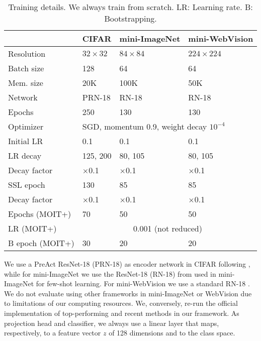 \documentclass[final]{cvpr}
\begin{document}
\begin{table}[!t]
\centering{}\caption{\label{tab:Training-details}Training details. We always train from
scratch. LR: Learning rate. B: Bootstrapping.}
\smallskip{}
\setlength{\tabcolsep}{3pt}{\small{}}\begin{tabular}{llll}
\toprule
 & {\small{}CIFAR} & {\small{}mini-ImageNet} & {\small{}mini-WebVision}\tabularnewline
\midrule
{\small{}Resolution} & {\small{}$32\times32$} & {\small{}$84\times84$} & {\small{}$224\times224$}\tabularnewline

{\small{}Batch size} & {\small{}128} & {\small{}64} & {\small{}64}\tabularnewline

{\small{}Mem. size} & {\small{}20K} & {\small{}100K} & {\small{}50K}\tabularnewline

{\small{}Network} & {\small{}PRN-18} & {\small{}RN-18} & {\small{}RN-18}\tabularnewline

{\small{}Epochs} & {\small{}250} & {\small{}130} & {\small{}130}\tabularnewline

{\small{}Optimizer} & \multicolumn{3}{l}{{\small{}SGD, momentum 0.9, weight decay $10^{-4}$ }}\tabularnewline

{\small{}Initial LR} & {\small{}0.1} & {\small{}0.1} & {\small{}0.1}\tabularnewline

{\small{}LR decay} & {\small{}125, 200} & {\small{}80, 105} & {\small{}80, 105}\tabularnewline

{\small{}Decay factor} & {\small{}$\times$0.1} & {\small{}$\times$0.1} & {\small{}$\times$0.1}\tabularnewline

{\small{}SSL epoch} & {\small{}130} & {\small{}85} & {\small{}85}\tabularnewline

{\small{}Decay factor} & {\small{}$\times$0.1} & {\small{}$\times$0.1} & {\small{}$\times$0.1}\tabularnewline

{\small{}Epochs (MOIT+)} & {\small{}70} & {\small{}50} & {\small{}50}\tabularnewline

{\small{}LR (MOIT+)} & \multicolumn{3}{c}{{\small{}0.001 (not reduced)}}\tabularnewline

{\small{}B epoch (MOIT+)} & {\small{}30} & {\small{}20} & {\small{}20}\tabularnewline
\bottomrule
\end{tabular}
\end{table}

We use a PreAct ResNet-18 (PRN-18) \cite{2016_ECCV_PreActResNet} as encoder network in CIFAR following \cite{2019_ICML_DynamicBootstrapping}, while for mini-ImageNet we use the ResNet-18 (RN-18) from \cite{2020_arXiv_ResNetFewShot} used in mini-ImageNet for few-shot learning. For mini-WebVision we use a standard RN-18 \cite{2016_CVPR_ResNet}. We do not evaluate using other frameworks in mini-ImageNet or WebVision \cite{2020_ICML_DatasetOOD,2020_ICLR_DivideMix} due to limitations of our computing resources. We, conversely, re-run the official implementation of top-performing and recent methods \cite{2018_ICLR_mixup,2020_ICLR_DivideMix,2020_NeurIPS_EarlyReg} in our framework. As projection head and classifier, we always use a linear layer that maps, respectively, to a feature vector $z$ of 128 dimensions and to the class space.
\end{document}
